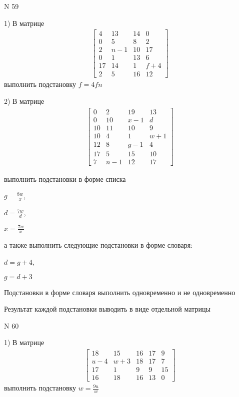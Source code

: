 \documentclass[11pt]{report}
\begin{document}
\newpage
N 59


    1) В матрице
\begin{align*}
\left[\begin{matrix}4 & 13 & 14 & 0\\0 & 5 & 8 & 2\\2 & n - 1 & 10 & 17\\0 & 1 & 13 & 6\\17 & 14 & 1 & f + 4\\2 & 5 & 16 & 12\end{matrix}\right]
\end{align*}
выполнить подстановку $f=4 f n$


    2) В матрице
\begin{align*}
\left[\begin{matrix}0 & 2 & 19 & 13\\0 & 10 & x - 1 & d\\10 & 11 & 10 & 9\\10 & 4 & 1 & w + 1\\12 & 8 & g - 1 & 4\\17 & 5 & 15 & 10\\7 & n - 1 & 12 & 17\end{matrix}\right]
\end{align*}

выполнить подстановки в форме списка

$g=\frac{8 w}{x}$,

$d=\frac{7 w}{d}$,

$x=\frac{7 w}{x}$

а также выполнить следующие подстановки в форме словаря:

$d=g + 4$,

$g=d + 3$


    Подстановки в форме словаря выполнить одновременно и не одновременно


    Результат каждой подстановки выводить в виде отдельной матрицы

\newpage
N 60


    1) В матрице
\begin{align*}
\left[\begin{matrix}18 & 15 & 16 & 17 & 9\\u - 4 & w + 3 & 18 & 17 & 7\\17 & 1 & 9 & 9 & 15\\16 & 18 & 16 & 13 & 0\end{matrix}\right]
\end{align*}
выполнить подстановку $w=\frac{9 u}{w}$
\end{document}
